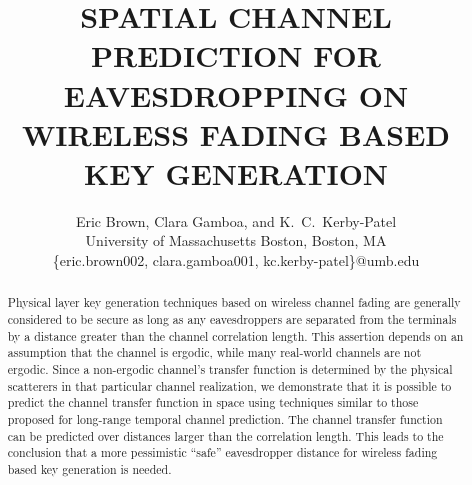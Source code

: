 \documentclass{allertonproc}
\title{SPATIAL CHANNEL PREDICTION FOR EAVESDROPPING ON WIRELESS FADING BASED KEY GENERATION}
\date{}
\author{Eric Brown, Clara Gamboa, and K.~C.~Kerby-Patel\\University of Massachusetts Boston, Boston, MA\\ \{eric.brown002, clara.gamboa001, kc.kerby-patel\}@umb.edu}
\begin{document}
\maketitle
\begin{abstract}

Physical layer key generation techniques based on wireless channel fading are generally considered to be secure as long as any eavesdroppers are separated from the terminals by a distance greater than the channel correlation length.  This assertion depends on an assumption that the channel is ergodic, while many real-world channels are not ergodic.  Since a non-ergodic channel's transfer function is determined by the physical scatterers in that particular channel realization, we demonstrate that it is possible to predict the channel transfer function in space using techniques similar to those proposed for long-range temporal channel prediction.  The channel transfer function can be predicted over distances larger than the correlation length.  This leads to the conclusion that a more pessimistic ``safe'' eavesdropper distance for wireless fading based key generation is needed.
\end{abstract}
\end{document}
